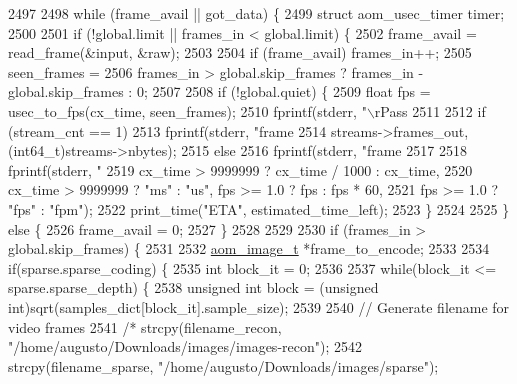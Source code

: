 \begin{DoxyCodeInclude}
{{{{{{{{{{{{{{{{{{{{{{{{{{{{{{{{{{{{{{{{{{{{{{{{{{{{{{{{{{{{{{{{{{2497 
2498     \textcolor{keywordflow}{while} (frame\_avail || got\_data) \{
2499       \textcolor{keyword}{struct }aom\_usec\_timer timer;
2500 
2501       \textcolor{keywordflow}{if} (!global.limit || frames\_in < global.limit) \{
2502         frame\_avail = read\_frame(&input, &raw);
2503 
2504         \textcolor{keywordflow}{if} (frame\_avail) frames\_in++;
2505         seen\_frames =
2506             frames\_in > global.skip\_frames ? frames\_in - global.skip\_frames : 0;
2507 
2508         \textcolor{keywordflow}{if} (!global.quiet) \{
2509           \textcolor{keywordtype}{float} fps = usec\_to\_fps(cx\_time, seen\_frames);
2510           fprintf(stderr, \textcolor{stringliteral}{"\(\backslash\)rPass %
2511 
2512           \textcolor{keywordflow}{if} (stream\_cnt == 1)
2513             fprintf(stderr, \textcolor{stringliteral}{"frame %
2514                 streams->frames\_out, (int64\_t)streams->nbytes);
2515           \textcolor{keywordflow}{else}
2516             fprintf(stderr, \textcolor{stringliteral}{"frame %
2517 
2518           fprintf(stderr, \textcolor{stringliteral}{"%
2519               cx\_time > 9999999 ? cx\_time / 1000 : cx\_time,
2520                   cx\_time > 9999999 ? \textcolor{stringliteral}{"ms"} : \textcolor{stringliteral}{"us"}, fps >= 1.0 ? fps : fps * 60,
2521                       fps >= 1.0 ? \textcolor{stringliteral}{"fps"} : \textcolor{stringliteral}{"fpm"});
2522           print\_time(\textcolor{stringliteral}{"ETA"}, estimated\_time\_left);
2523         \}
2524 
2525       \} \textcolor{keywordflow}{else} \{
2526         frame\_avail = 0;
2527       \}
2528 
2529 
2530       \textcolor{keywordflow}{if} (frames\_in > global.skip\_frames) \{
2531 
2532         \hyperlink{structaom__image}{aom\_image\_t} *frame\_to\_encode;
2533 
2534         \textcolor{keywordflow}{if}(sparse.sparse\_coding) \{
2535           \textcolor{keywordtype}{int} block\_it = 0;
2536 
2537           \textcolor{keywordflow}{while}(block\_it <= sparse.sparse\_depth) \{
2538             \textcolor{keywordtype}{unsigned} \textcolor{keywordtype}{int} block = (\textcolor{keywordtype}{unsigned} int)sqrt(samples\_dict[block\_it].sample\_size);
2539 
2540             \textcolor{comment}{// Generate filename for video frames}
2541             \textcolor{comment}{/* strcpy(filename\_recon, "/home/augusto/Downloads/images/images-recon");}
2542 \textcolor{comment}{            strcpy(filename\_sparse, "/home/augusto/Downloads/images/sparse");}
}}}}}}}}}}}}}}}}}}}}}}}}}}}}}}}}}}}}}}}}}}}}}}}}}}}}}}}}}}}}}}}}}}}}}}
\end{DoxyCodeInclude}
